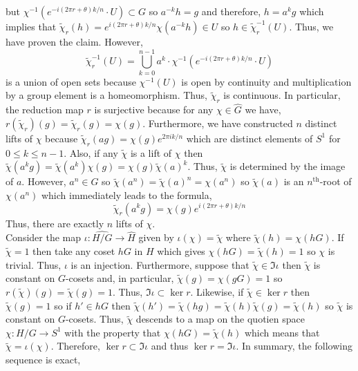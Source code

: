 \documentclass[12pt]{extarticle}
\begin{document}
\begin{enumerate}
but $\chi^{-1}(e^{- i (2 \pi r + \theta) k /n} \cdot U ) \subset G$ so $a^{-k} h = g$ and therefore, $h = a^k g$ which implies that $\tilde{\chi}_r(h) =  e^{i (2 \pi r + \theta) k /n} \chi(a^{-k} h) \in U$ so $h \in \tilde{\chi}_r^{-1}(U)$. Thus, we have proven the claim. However,
\[ \tilde{\chi}_r^{-1}(U) = \bigcup_{k = 0}^{n - 1} a^k \cdot \chi^{-1}(e^{- i (2 \pi r + \theta) k /n} \cdot U )  \] 
is a union of open sets because $\chi^{-1}(U)$ is open by continuity and multiplication by a group element is a homeomorphism. Thus, $\tilde{\chi}_r$ is continuous. In particular, the reduction map $r$ is surjective because for any $\chi \in \hat{G}$ we have, $r(\tilde{\chi}_r)(g) = \tilde{\chi}_r(g) = \chi(g)$. Furthermore, we have constructed $n$ distinct lifts of $\chi$ because $\tilde{ \chi}_r(ag) = \chi(g) e^{2 \pi i k / n}$ which are distinct elements of $S^1$ for $0 \le k \le n - 1$. Also, if any $\tilde{\chi}$ is a lift of $\chi$ then $\tilde{\chi}(a^k g) = \tilde{\chi}(a^k) \chi(g) = \chi(g) \tilde{\chi}(a)^k$. Thus, $\tilde{\chi}$ is determined by the image of $a$. However, $a^n \in G$ so $\tilde{\chi}(a^n) = \tilde{\chi}(a)^n = \chi(a^n)$ so $\tilde{\chi}(a)$ is an $n^{\mathrm{th}}$-root of $\chi(a^n)$ which immediately leads to the formula,
\[\tilde{\chi}_r (a^k g) = \chi(g) e^{ i (2 \pi r + \theta) k /n } \]
Thus, there are exactly $n$ lifts of $\chi$.  \bigskip \\
Consider the map $\iota : \widehat{H/G} \to \hat{H}$ given by $\iota(\chi) = \tilde{\chi}$ where $\tilde{\chi}(h) = \chi(hG)$. If $\tilde{\chi} = 1$ then take any coset $hG$ in $H$ which gives $\chi(hG) = \tilde{\chi}(h) = 1$ so $\chi$ is trivial. Thus, $\iota$ is an injection. Furthermore, suppose that $\tilde{\chi} 
\in \Im{\iota}$ then $\tilde{\chi}$ is constant on $G$-cosets and, in particular, $\tilde{\chi}(g) = \chi(gG) = 1$ so $r(\tilde{\chi})(g) = \tilde{\chi}(g) = 1$. Thus, $\Im{\iota} \subset \ker{r}$. Likewise, if $\tilde{\chi} \in \ker{r}$ then $\tilde{\chi}(g) = 1$ so if $h' \in h G$ then $\tilde{\chi}(h') = \tilde{\chi}(hg) = \tilde{\chi}(h) \tilde{\chi}(g) = \tilde{\chi}(h)$ so $\tilde{\chi}$ is constant on $G$-cosets. Thus, $\tilde{\chi}$ descends to a map on the quotien space $\chi : H/G \to S^1$ with the property that $\chi(hG) = \tilde{\chi}(h)$ which means that $\tilde{\chi} = \iota(\chi)$. Therefore, $\ker{r} \subset \Im{\iota}$ and thus $\ker{r} = \Im{\iota}$. In summary, the following sequence is exact,
\begin{center}
\end{center}


\end{enumerate}
\end{document}
